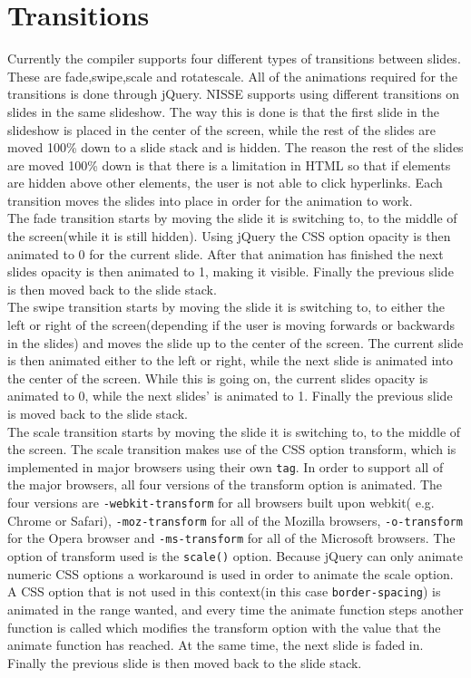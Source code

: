 \section{Transitions}
Currently the compiler supports four different types of transitions between slides. These are fade,swipe,scale and rotatescale. All of the animations required for the transitions is done through jQuery. NISSE supports using different transitions on slides in the same slideshow. The way this is done is that the first slide in the slideshow is placed in the center of the screen, while the rest of the slides are moved 100\% down to a slide stack and is hidden. The reason the rest of the slides are moved 100\% down is that there is a limitation in HTML so that if elements are hidden above other elements, the user is not able to click hyperlinks. Each transition moves the slides into place in order for the animation to work.\\
The fade transition starts by moving the slide it is switching to, to the middle of the screen(while it is still hidden). Using jQuery the CSS option opacity is then animated to 0 for the current slide. After that animation has finished the next slides opacity is then animated to 1, making it visible. Finally the previous slide is then moved back to the slide stack.\\
The swipe transition starts by moving the slide it is switching to, to either the left or right of the screen(depending if the user is moving forwards or backwards in the slides) and moves the slide up to the center of the screen. The current slide is then animated either to the left or right, while the next slide is animated into the center of the screen. While this is going on, the current slides opacity is animated to 0, while the next slides' is animated to 1. Finally the previous slide is moved back to the slide stack.\\
The scale transition starts by moving the slide it is switching to, to the middle of the screen. The scale transition makes use of the CSS option transform, which is implemented in major browsers using their own \texttt{tag}. In order to support all of the major browsers, all four versions of the transform option is animated. The four versions are \texttt{-webkit-transform} for all browsers built upon webkit( e.g. Chrome or Safari), \texttt{-moz-transform} for all of the Mozilla browsers, \texttt{-o-transform} for the Opera browser and \texttt{-ms-transform} for all of the Microsoft browsers. The option of transform used is the \texttt{scale()} option. Because jQuery can only animate numeric CSS options a workaround is used in order to animate the scale option. A CSS option that is not used in this context(in this case \texttt{border-spacing}) is animated in the range wanted, and every time the animate function steps another function is called which modifies the transform option with the value that the animate function has reached. At the same time, the next slide is faded in. Finally the previous slide is then moved back to the slide stack.\\
